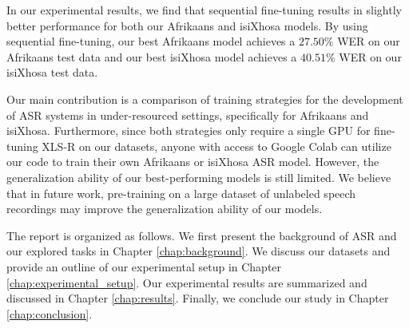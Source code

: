 In our experimental results, we find that sequential fine-tuning results in slightly better performance for both our Afrikaans and isiXhosa models.
By using sequential fine-tuning, our best Afrikaans model achieves a $27.50\%$ WER on our Afrikaans test data and our best isiXhosa model achieves a $40.51\%$ WER on our isiXhosa test data.

Our main contribution is a comparison of training strategies for the development of ASR systems in under-resourced settings, specifically for Afrikaans and isiXhosa.
Furthermore, since both strategies only require a single GPU for fine-tuning XLS-R on our datasets, 
anyone with access to Google Colab can utilize our code to train their own Afrikaans or isiXhosa ASR model.
However, the generalization ability of our best-performing models is still limited.
We believe that in future work, pre-training on a large dataset of unlabeled speech recordings may improve the generalization ability of our models.

The report is organized as follows. We first present the background of ASR and our explored tasks in Chapter \ref{chap:background}. 
We discuss our datasets and provide an outline of our experimental setup in Chapter \ref{chap:experimental_setup}.
Our experimental results are summarized and discussed in Chapter \ref{chap:results}.
Finally, we conclude our study in Chapter \ref{chap:conclusion}.